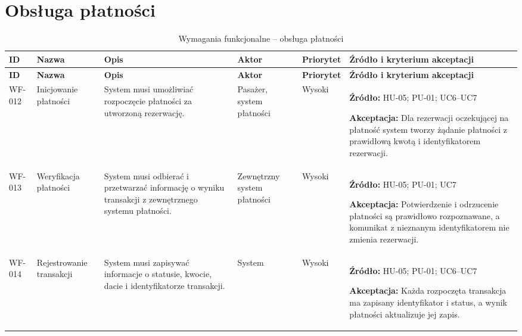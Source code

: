 \documentclass[12pt,a4paper,oneside]{report}
\begin{document}
\section{Obsługa płatności}
\small
\begin{longtable}{|p{1.05cm}|p{2.15cm}|p{3.35cm}|p{1.75cm}|p{0.95cm}|p{4.05cm}|}
\caption{Wymagania funkcjonalne -- obsługa płatności}\\\hline
\rowcolor{lightblue}\textbf{ID} & \textbf{Nazwa} & \textbf{Opis} & \textbf{Aktor} & \textbf{Priorytet} & \textbf{Źródło i kryterium akceptacji}\\\hline
\endfirsthead
\hline
\rowcolor{lightblue}\textbf{ID} & \textbf{Nazwa} & \textbf{Opis} & \textbf{Aktor} & \textbf{Priorytet} & \textbf{Źródło i kryterium akceptacji}\\\hline
\endhead
WF-012 & Inicjowanie płatności & System musi umożliwiać rozpoczęcie płatności za utworzoną rezerwację. & Pasażer, system płatności & Wysoki & \textbf{Źródło:} HU-05; PU-01; UC6–UC7\par\textbf{Akceptacja:} Dla rezerwacji oczekującej na płatność system tworzy żądanie płatności z prawidłową kwotą i identyfikatorem rezerwacji.\\\hline
WF-013 & Weryfikacja płatności & System musi odbierać i przetwarzać informację o wyniku transakcji z zewnętrznego systemu płatności. & Zewnętrzny system płatności & Wysoki & \textbf{Źródło:} HU-05; PU-01; UC7\par\textbf{Akceptacja:} Potwierdzenie i odrzucenie płatności są prawidłowo rozpoznawane, a komunikat z nieznanym identyfikatorem nie zmienia rezerwacji.\\\hline
WF-014 & Rejestrowanie transakcji & System musi zapisywać informacje o statusie, kwocie, dacie i identyfikatorze transakcji. & System & Wysoki & \textbf{Źródło:} HU-05; PU-01; UC6–UC7\par\textbf{Akceptacja:} Każda rozpoczęta transakcja ma zapisany identyfikator i status, a wynik płatności aktualizuje jej zapis.\\\hline
\end{longtable}
\normalsize
\end{document}
